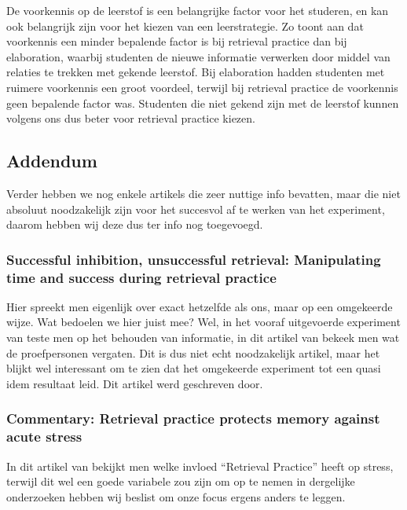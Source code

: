 \documentclass{hogent-article}
\begin{document}
            De voorkennis op de leerstof is een belangrijke factor voor het studeren, en kan ook 
            belangrijk zijn voor het kiezen van een leerstrategie. Zo toont \cite{Xiaofeng2016} aan dat voorkennis een minder bepalende factor is bij retrieval practice dan bij elaboration, waarbij studenten de nieuwe informatie verwerken door middel van relaties te trekken met gekende leerstof.
            Bij elaboration hadden studenten met ruimere voorkennis een groot voordeel, terwijl bij retrieval
            practice de voorkennis geen bepalende factor was.
            Studenten die niet gekend zijn met de leerstof kunnen volgens ons dus beter voor retrieval 
            practice kiezen.
            
        \subsection{Addendum}
        
        Verder hebben we nog enkele artikels die zeer nuttige info bevatten, maar die niet absoluut noodzakelijk zijn voor het succesvol af te werken van het experiment, daarom hebben wij deze dus ter info nog toegevoegd.
        
        \subsubsection{Successful inhibition, unsuccessful retrieval: Manipulating time and success during retrieval practice}
        
        Hier spreekt men eigenlijk over exact hetzelfde als ons, maar op een omgekeerde wijze. Wat bedoelen we hier juist mee? Wel, in het vooraf uitgevoerde experiment van \cite{HenryRoediger2006} teste men op het behouden van informatie, in dit artikel van \cite{BenjaminStorm2009} bekeek men wat de proefpersonen vergaten. Dit is dus niet echt noodzakelijk artikel, maar het blijkt wel interessant om te zien dat het omgekeerde experiment tot een quasi idem resultaat leid. Dit artikel werd geschreven door. 
        
        \subsubsection{Commentary: Retrieval practice protects memory against acute stress}
        
        In dit artikel van \cite{Smith2016} bekijkt men welke invloed ``Retrieval Practice'' heeft op stress, terwijl dit wel een goede variabele zou zijn om op te nemen in dergelijke onderzoeken hebben wij beslist om onze focus ergens anders te leggen.
        
\end{document}
